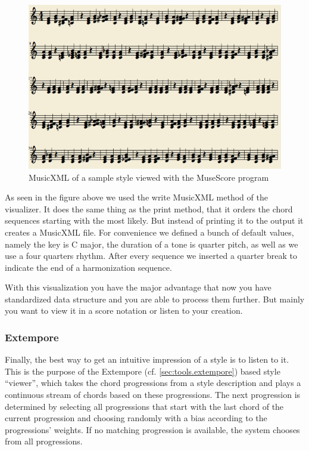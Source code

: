 \begin{figure}[ht]
\includegraphics[scale=.5]{Chapters/pic/xml_print.png}
\caption{MusicXML of a sample style viewed with the MuseScore program}
\end{figure}

As seen in the figure above we used the write MusicXML method of the visualizer. It does the same thing as the print method, that it orders the chord sequences starting with the most likely. But instead of printing it to the output it creates a MusicXML file. For convenience we defined a bunch of default values, namely the key is C major, the duration of a tone is quarter pitch, as well as we use a four quarters rhythm. After every sequence we inserted a quarter break to indicate the end of a harmonization sequence.

With this visualization you have the major advantage that now you have standardized data structure and you are able to process them further. But mainly you want to view it in a score notation or listen to your creation.

\subsubsection{Extempore}
\label{sec:viewers.extempore}

Finally, the best way to get an intuitive impression of a style is to listen to it.
This is the purpose of the Extempore (cf. \ref{sec:tools.extempore}) based style ``viewer'', which takes the chord progressions from a style description and plays a continuous stream of chords based on these progressions.
The next progression is determined by selecting all progressions that start with the last chord of the current progression and choosing randomly with a bias according to the progressions' weights.
If no matching progression is available, the system chooses from all progressions.

